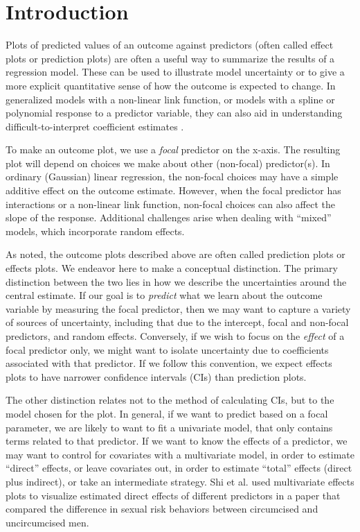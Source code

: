 
\linenumbers

\section{Introduction}

Plots of predicted values of an outcome against predictors (often called effect plots or prediction plots) are often a useful way to summarize the results of a regression model. These can be used to illustrate model uncertainty or to give a more explicit quantitative sense of how the outcome is expected to change. In generalized models with a non-linear link function, or models with a spline or polynomial response to a predictor variable, they can also aid in understanding difficult-to-interpret coefficient estimates \citep{brambor_understanding_2006, berry_improving_2012, leeper2017interpreting}. 

To make an outcome plot, we use a \emph{focal} predictor on the x-axis. The resulting plot will depend on choices we make about other (non-focal) predictor(s). In ordinary (Gaussian) linear regression, the non-focal choices may have a simple additive effect on the outcome estimate. However, when the focal predictor has interactions or a non-linear link function, non-focal choices can also affect the slope of the response. Additional challenges arise when dealing with “mixed” models, which incorporate random effects.

As noted, the outcome plots described above are often called prediction plots or effects plots. We endeavor here to make a conceptual distinction. 
The primary distinction between the two lies in how we describe the uncertainties around the central estimate. 
If our goal is to \emph{predict} what we learn about the outcome variable by measuring the focal predictor, then we may want to capture a variety of sources of uncertainty, including that due to the intercept, focal and non-focal predictors, and random effects.
Conversely, if we wish to focus on the \emph{effect} of a focal predictor only, we might want to isolate uncertainty due to coefficients associated with that predictor.
If we follow this convention, we expect effects plots to have narrower confidence intervals (CIs) than prediction plots.

The other distinction relates not to the method of calculating CIs, but to the model chosen for the plot. 
In general, if we want to predict based on a focal parameter, we are likely to want to fit a univariate model, that only contains terms related to that predictor.
If we want to know the effects of a predictor, we may want to control for covariates with a multivariate model, in order to estimate “direct” effects, or leave covariates out, in order to estimate “total” effects (direct plus indirect), or take an intermediate strategy.
Shi et al. \citep{shi_evidence_2017} used multivariate effects plots to visualize estimated direct effects of different predictors in a paper that compared the difference in sexual risk behaviors between circumcised and uncircumcised men.

